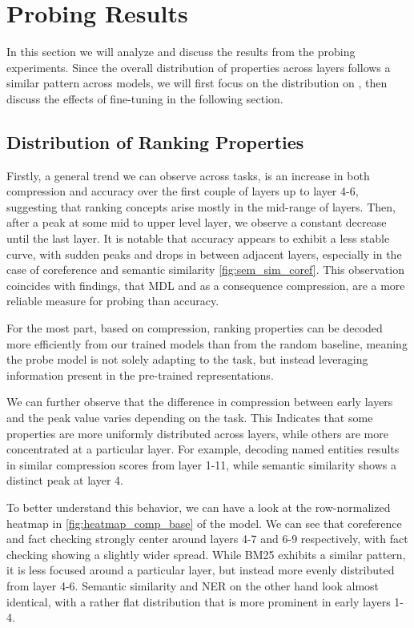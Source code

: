 \chapter{Probing Results}
\label{chap:results}
In this section we will analyze and discuss the results from the probing experiments. Since the overall distribution of properties across layers follows a similar pattern across models, we will first focus on the distribution on , then discuss the effects of fine-tuning in the following section.

\section{Distribution of Ranking Properties}
Firstly, a general trend we can observe across tasks, is an increase in both compression and accuracy over the first couple of layers up to layer 4-6, suggesting that ranking concepts arise mostly in the mid-range of layers. Then, after a peak at some mid to upper level layer, we observe a constant decrease until the last layer. It is notable that accuracy appears to exhibit a less stable curve, with sudden peaks and drops in between adjacent layers, especially in the case of coreference and semantic similarity \autoref{fig:sem_sim_coref}. This observation coincides with \cite{voita-titov-2020-information} findings, that MDL and as a consequence compression, are a more reliable measure for probing than accuracy.

For the most part, based on compression, ranking properties can be decoded more efficiently from our trained models than from the random baseline, meaning the probe model is not solely adapting to the task, but instead leveraging information present in the pre-trained representations.

We can further observe that the difference in compression between early layers and the peak value varies depending on the task. This Indicates that some properties are more uniformly distributed across layers, while others are more concentrated at a particular layer. For example, decoding named entities results in similar compression scores from layer 1-11, while semantic similarity shows a distinct peak at layer 4.

To better understand this behavior, we can have a look at the row-normalized heatmap in \autoref{fig:heatmap_comp_base} of the  model. We can see that coreference and fact checking strongly center around layers 4-7 and 6-9 respectively, with fact checking showing a slightly wider spread. While BM25 exhibits a similar pattern, it is less focused around a particular layer, but instead more evenly distributed from layer 4-6. Semantic similarity and NER on the other hand look almost identical, with a rather flat distribution that is more prominent in early layers 1-4.

